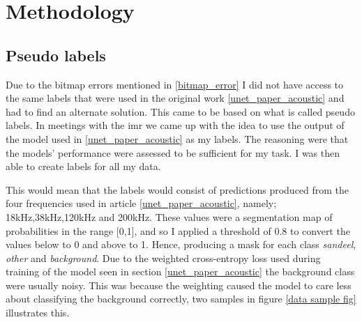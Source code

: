 \chapter{Methodology}
    \section{Pseudo labels} \label{Pseudo label}
        Due to the bitmap errors mentioned in \ref{bitmap_error} I did not have access to the same labels that were used in the original work \ref{unet_paper_acoustic} and had to find an alternate solution. This came to be based on what is called pseudo labels. In meetings with the \gls{imr} we came up with the idea to use the output of the model used in \ref{unet_paper_acoustic} as my labels. The reasoning were that the models' performance were assessed to be sufficient for my task. I was then able to create labels for all my data.
        
        This would mean that the labels would consist of predictions produced from the four frequencies used in article \ref{unet_paper_acoustic}, namely; 18kHz,38kHz,120kHz and 200kHz. These values were a segmentation map of probabilities in the range [0,1], and so I applied a threshold of 0.8 to convert the values below to 0 and above to 1. Hence, producing a mask for each class \textit{sandeel}, \textit{other} and \textit{background}. Due to the weighted cross-entropy loss used during training of the model seen in section \ref{unet_paper_acoustic} the background class were usually noisy. This was because the weighting caused the model to care less about classifying the background correctly, two samples in figure \ref{data sample fig} illustrates this.
        
